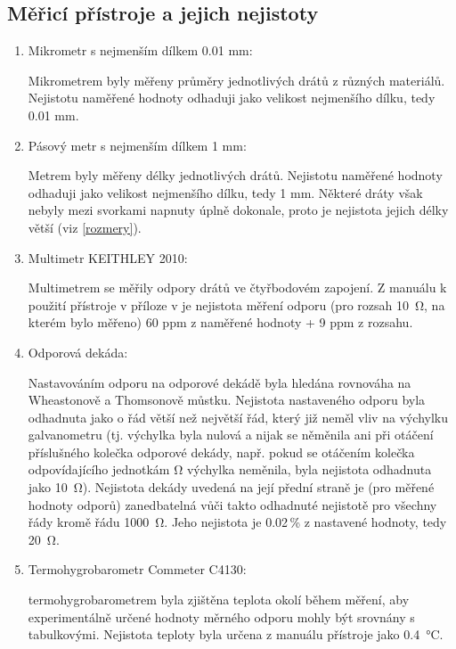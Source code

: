 \documentclass{../concepts/prepareprotokol} %
\begin{document}
\subsection{Měřicí přístroje a jejich nejistoty} \label{pomucky}
\begin{enumerate}
    \item Mikrometr s nejmenším dílkem 0.01 mm:
    
    Mikrometrem byly měřeny průměry jednotlivých drátů z různých materiálů. Nejistotu naměřené hodnoty odhaduji jako velikost nejmenšího dílku, tedy 0.01 mm.

    \item Pásový metr s nejmenším dílkem 1 mm:

    Metrem byly měřeny délky jednotlivých drátů. Nejistotu naměřené hodnoty odhaduji jako velikost nejmenšího dílku, tedy 1 mm. Některé dráty však nebyly mezi svorkami napnuty úplně dokonale, proto je nejistota jejich délky větší (viz \ref{rozmery}).

    \item Multimetr KEITHLEY 2010:

    Multimetrem se měřily odpory drátů ve čtyřbodovém zapojení. Z manuálu k použití přístroje v příloze v \cite{pokyny} je nejistota měření odporu (pro rozsah \SI{10}{\ohm}, na kterém bylo měřeno) 60 ppm z naměřené hodnoty + 9 ppm z rozsahu.

    \item Odporová dekáda:

    Nastavováním odporu na odporové dekádě byla hledána rovnováha na Wheastonově a Thomsonově můstku. Nejistota 
    nastaveného odporu byla odhadnuta jako o řád větší než největší řád, který již neměl vliv na výchylku galvanometru 
    (tj. výchylka byla nulová a nijak se něměnila ani při otáčení příslušného kolečka odporové dekády, např. pokud se otáčením
    kolečka odpovídajícího jednotkám \si{\ohm} výchylka neměnila, byla nejistota odhadnuta jako \SI{10}{\ohm}). Nejistota
    dekády uvedená na její přední straně je (pro měřené hodnoty odporů) zanedbatelná vůči takto odhadnuté nejistotě pro 
    všechny řády kromě řádu \SI{1000}{\ohm}. Jeho nejistota je 0.02\,\% z nastavené hodnoty, tedy \SI{20}{\ohm}.

    \item Termohygrobarometr Commeter C4130:

    termohygrobarometrem byla zjištěna teplota okolí během měření, aby experimentálně určené hodnoty měrného odporu mohly být srovnány s tabulkovými. Nejistota teploty byla určena z manuálu přístroje jako \SI{0.4}{\celsius}.

\end{enumerate}
\end{document}
